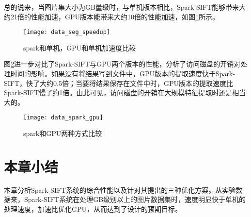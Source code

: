 总的说来，当图片集大小为GB量级时，与单机版本相比，Spark-SIFT能够带来大约21倍的性能加速，GPU版本能带来大约10倍的性能加速，如图\ref{fig:data_seg_speedup}所示。
\begin{figure}[htp]
\centering
\texttt{[image: data\_seg\_speedup]}
\caption{spark和单机，GPU和单机加速度比较}
\label{fig:data_seg_speedup}
\end{figure}

图\ref{fig:data_spark_gpu}进一步对比了Spark-SIFT与GPU两个版本的性能，分析了访问磁盘的开销对处理时间的影响。如果没有将结果写到文件中，GPU版本的提取速度快于Spark-SIFT，快了大约0.5倍；当要将结果保存在文件中时，GPU版本的提取速度比Spark-SIFT慢了约1倍。由此可见，访问磁盘的开销在大规模特征提取时还是相当大的。
\begin{figure}[htp]
\centering
\texttt{[image: data\_spark\_gpu]}
\caption{spark和GPU两种方式比较}
\label{fig:data_spark_gpu}
\end{figure}
\section{本章小结}
本章分析Spark-SIFT系统的综合性能以及针对其提出的三种优化方案。从实验数据来，Spark-SIFT系统在处理GB级别以上的图片数据集时，速度明显快于单机的处理速度，加速比优化GPU，从而达到了设计的预期目标。